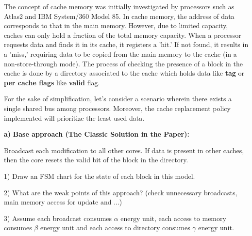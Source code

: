 The concept of cache memory was initially investigated by processors such as Atlas2 and IBM System/360 Model 85. In cache memory, the address of data corresponds to that in the main memory. However, due to limited capacity, caches can only hold a fraction of the total memory capacity. When a processor requests data and finds it in its cache, it registers a 'hit.' If not found, it results in a 'miss,' requiring data to be copied from the main memory to the cache (in a non-store-through mode). The process of checking the presence of a block in the cache is done by a directory associated to the cache which holds data like \textbf{tag} or \textbf{per cache flags} like \textbf{valid} flag.

For the sake of simplification, let's consider a scenario wherein there exists a single shared bus among processors. Moreover, the cache replacement policy implemented will prioritize the least used data.

\vspace{1cm}

\textbf{a)} \textbf{Base approach (The Classic Solution in the Paper): }

\vspace{1mm}

Broadcast each modification to all other cores. If data is present in other caches, then the core resets the valid bit of the block in the directory.

\vspace{1mm}

1) Draw an FSM chart for the state of each block in this model.

\vspace{1mm}

2) What are the weak points of this approach? (check unnecessary broadcasts, main memory access for update and ...)

\vspace{1mm}

3) Assume each broadcast consumes $\alpha \text{ energy unit}$, each access to memory consumes $\beta \text{ energy unit}$ and each access to directory consumes $\gamma \text{ energy unit}$. 

